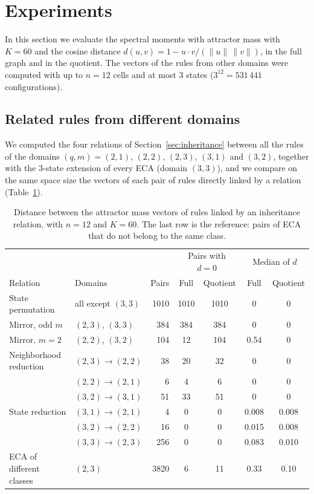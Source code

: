 \section{Experiments}
\label{sec:experiments}

In this section we evaluate the spectral moments with attractor mass with $K = 60$ and the cosine distance $d(u, v) = 1 - u \cdot v / (\|u\|\,\|v\|)$, in the full graph and in the quotient. The vectors of the rules from other domains were computed with up to $n = 12$ cells and at most 3 states ($3^{12} = 531\,441$ configurations).

\subsection{Related rules from different domains}
\label{subsec:cross-domain}

We computed the four relations of Section~\ref{sec:inheritance} between all the rules of the domains $(q, m) = (2,1)$, $(2,2)$, $(2,3)$, $(3,1)$ and $(3,2)$, together with the 3-state extension of every ECA (domain $(3,3)$), and we compare on the same space size the vectors of each pair of rules directly linked by a relation (Table~\ref{tab:cross-domain}).

\begin{table}[!htbp]
\centering
\setlength{\tabcolsep}{2.5pt}
\begin{tabular}{llrcccc}
\hline
 & & & \multicolumn{2}{c}{Pairs with $d = 0$} & \multicolumn{2}{c}{Median of $d$} \\
Relation & Domains & Pairs & Full & Quotient & Full & Quotient \\
\hline
State permutation & all except $(3,3)$ & 1010 & 1010 & 1010 & 0 & 0 \\
Mirror, odd $m$ & $(2,3)$, $(3,3)$ & 384 & 384 & 384 & 0 & 0 \\
Mirror, $m = 2$ & $(2,2)$, $(3,2)$ & 104 & 12 & 104 & 0.54 & 0 \\
Neighborhood reduction & $(2,3) \to (2,2)$ & 38 & 20 & 32 & 0 & 0 \\
 & $(2,2) \to (2,1)$ & 6 & 4 & 6 & 0 & 0 \\
 & $(3,2) \to (3,1)$ & 51 & 33 & 51 & 0 & 0 \\
State reduction & $(3,1) \to (2,1)$ & 4 & 0 & 0 & 0.008 & 0.008 \\
 & $(3,2) \to (2,2)$ & 16 & 0 & 0 & 0.015 & 0.008 \\
 & $(3,3) \to (2,3)$ & 256 & 0 & 0 & 0.083 & 0.010 \\
\hline
ECA of different classes & $(2,3)$ & 3820 & 6 & 11 & 0.33 & 0.10 \\
\hline
\end{tabular}
\caption{Distance between the attractor mass vectors of rules linked by an inheritance relation, with $n = 12$ and $K = 60$. The last row is the reference: pairs of ECA that do not belong to the same class.}
\label{tab:cross-domain}
\end{table}

